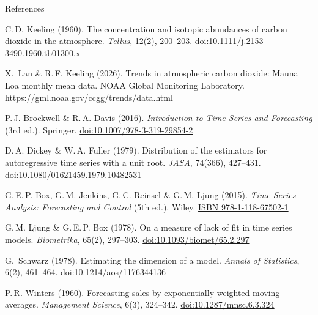 \documentclass[aspectratio=169,11pt,xcolor=table]{beamer}
\begin{document}
\begin{frame}{References}
\scriptsize
\begin{enumerate}[{[}1{]}]\setlength{\itemsep}{1pt}
  \item C.\,D. Keeling (1960). The concentration and isotopic abundances of carbon dioxide in the atmosphere. \emph{Tellus}, 12(2), 200--203. \href{https://doi.org/10.1111/j.2153-3490.1960.tb01300.x}{doi:10.1111/j.2153-3490.1960.tb01300.x}
  \item X.~Lan \& R.\,F. Keeling (2026). Trends in atmospheric carbon dioxide: Mauna Loa monthly mean data. NOAA Global Monitoring Laboratory. \url{https://gml.noaa.gov/ccgg/trends/data.html}
  \item P.\,J. Brockwell \& R.\,A. Davis (2016). \emph{Introduction to Time Series and Forecasting} (3rd ed.). Springer. \href{https://doi.org/10.1007/978-3-319-29854-2}{doi:10.1007/978-3-319-29854-2}
  \item D.\,A. Dickey \& W.\,A. Fuller (1979). Distribution of the estimators for autoregressive time series with a unit root. \emph{JASA}, 74(366), 427--431. \href{https://doi.org/10.1080/01621459.1979.10482531}{doi:10.1080/01621459.1979.10482531}
  \item G.\,E.\,P. Box, G.\,M. Jenkins, G.\,C. Reinsel \& G.\,M. Ljung (2015). \emph{Time Series Analysis: Forecasting and Control} (5th ed.). Wiley. \href{https://search.worldcat.org/title/908107438}{ISBN 978-1-118-67502-1}
  \item G.\,M. Ljung \& G.\,E.\,P. Box (1978). On a measure of lack of fit in time series models. \emph{Biometrika}, 65(2), 297--303. \href{https://doi.org/10.1093/biomet/65.2.297}{doi:10.1093/biomet/65.2.297}
  \item G.~Schwarz (1978). Estimating the dimension of a model. \emph{Annals of Statistics}, 6(2), 461--464. \href{https://doi.org/10.1214/aos/1176344136}{doi:10.1214/aos/1176344136}
  \item P.\,R. Winters (1960). Forecasting sales by exponentially weighted moving averages. \emph{Management Science}, 6(3), 324--342. \href{https://doi.org/10.1287/mnsc.6.3.324}{doi:10.1287/mnsc.6.3.324}
\end{enumerate}
\end{frame}
\end{document}
